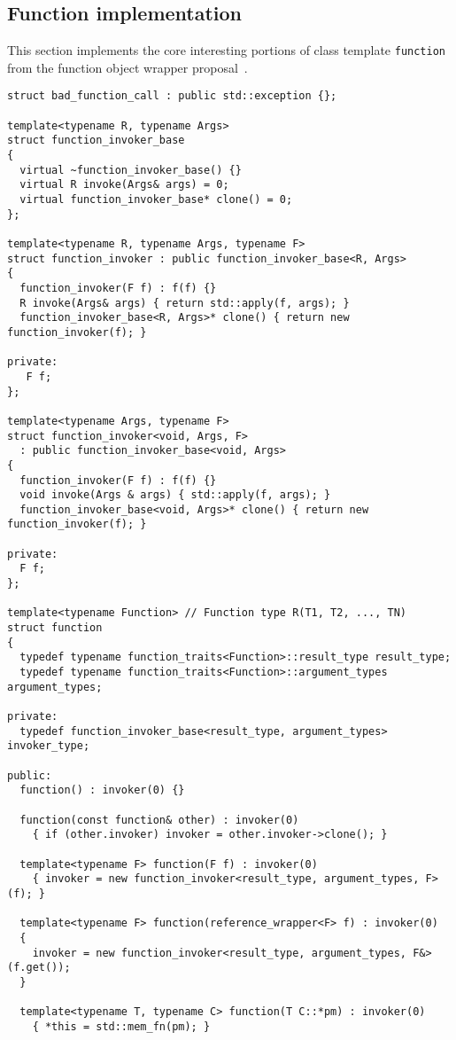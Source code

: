 \documentclass{article}
\begin{document}
\subsection{Function implementation}
\label{functionimpl}
This section implements the core interesting portions of class
template {\tt function} from the function object wrapper
proposal~\cite{Gregor02}.  
\small
\begin{verbatim}
struct bad_function_call : public std::exception {};

template<typename R, typename Args>
struct function_invoker_base
{
  virtual ~function_invoker_base() {}
  virtual R invoke(Args& args) = 0;
  virtual function_invoker_base* clone() = 0;
};

template<typename R, typename Args, typename F>
struct function_invoker : public function_invoker_base<R, Args>
{
  function_invoker(F f) : f(f) {}
  R invoke(Args& args) { return std::apply(f, args); }
  function_invoker_base<R, Args>* clone() { return new function_invoker(f); }

private:
   F f;
};

template<typename Args, typename F>
struct function_invoker<void, Args, F> 
  : public function_invoker_base<void, Args>
{
  function_invoker(F f) : f(f) {}
  void invoke(Args & args) { std::apply(f, args); }
  function_invoker_base<void, Args>* clone() { return new function_invoker(f); }

private:
  F f;
};

template<typename Function> // Function type R(T1, T2, ..., TN)
struct function
{
  typedef typename function_traits<Function>::result_type result_type;
  typedef typename function_traits<Function>::argument_types argument_types;
  
private:
  typedef function_invoker_base<result_type, argument_types> invoker_type;
  
public:
  function() : invoker(0) {}
  
  function(const function& other) : invoker(0)
    { if (other.invoker) invoker = other.invoker->clone(); }

  template<typename F> function(F f) : invoker(0)
    { invoker = new function_invoker<result_type, argument_types, F>(f); }

  template<typename F> function(reference_wrapper<F> f) : invoker(0)
  { 
    invoker = new function_invoker<result_type, argument_types, F&>(f.get()); 
  }
  
  template<typename T, typename C> function(T C::*pm) : invoker(0)
    { *this = std::mem_fn(pm); }


\end{verbatim}
\end{document}

